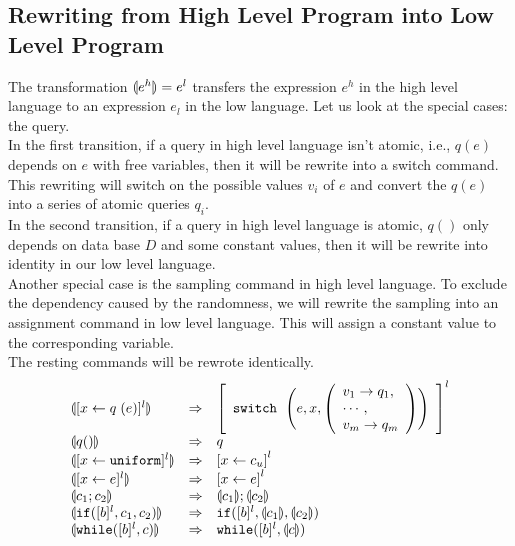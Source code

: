\documentclass[a4paper,11pt]{article}
\begin{document}
\subsection{Rewriting from High Level Program into Low Level Program}
%
The transformation $\llparenthesis {e^h} \rrparenthesis = e^l$ transfers the expression $e^h$ in the high level language to an expression $e_l$ in the low language. 
Let us look at the special cases: the query.
\\
In the first transition, if a query in high level language isn't atomic, i.e., 
$q(e)$ depends on $e$ with free variables, then it will be rewrite into a switch command. 
This rewriting will switch on the possible values $v_i$ of $e$ and convert the $q(e)$ into a series of atomic queries $q_i$.
\\
In the second transition, if a query in high level language is atomic, $q()$ only depends on data base $D$ and some constant values,
then it will be rewrite into identity in our low level language.
\\
Another special case is the sampling command in high level language. To exclude the dependency caused by the randomness, we will rewrite the sampling into an assignment command in low level language. This will assign a constant value to the corresponding variable.
\\
The resting commands will be rewrote identically.
%
%
\[
\begin{array}{lll}
\ts{ [\assign x q(e)]^{l}}
        & \Rightarrow &
        \left[
        \begin{array}{l}
             \eswitch ~ \Bigg(\expr, x, 
            \left(\begin{array}{l}
           v_1 \to q_1, \\
            \cdots, \\
            v_m \to q_m
            \end{array}\right) 
            \Bigg) \\
        \end{array}
        \right]^{l}\\
    \ts{q()} & \Rightarrow & q\\
  \ts{[\assign{x}{\uniform} ]^{l}}   &   \Rightarrow & \left[
\assign x c_{u}
\right]^{l} \\
 \ts{[\assign{x}{\expr} ]^{l}}   &   \Rightarrow & \left[ \assign x \expr \right]^{l} \\
 \ts{ c_1 ; c_2 }     & \Rightarrow  & \ts{c_1} ; \ts{c_2} \\
  \ts{\eif([\bexpr]^{l}, c_1, c_2)}  &  \Rightarrow & \eif([\bexpr]^{l}, \ts{c_1}, \ts{c_2}) \\
 \ts{\ewhile([\bexpr]^{l}, c)} & \Rightarrow & \ewhile([\bexpr]^{l},  \ts{c} ) \\
\end{array}
\]
\end{document}

